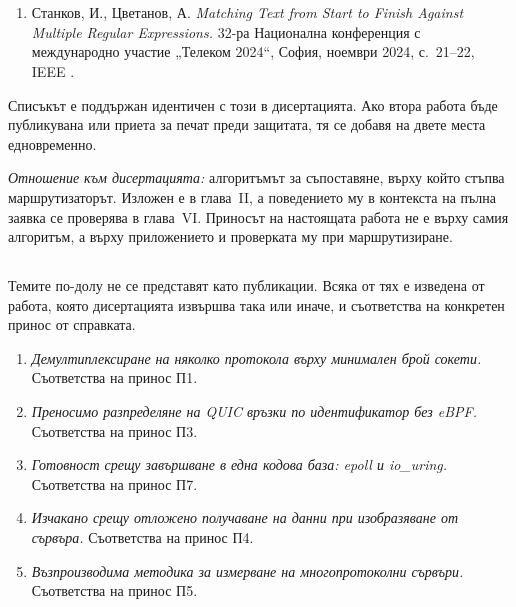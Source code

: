 %

\section*{}

\subsection*{}

\begin{enumerate}[leftmargin=*]
  \item Станков, И., Цветанов, А. \emph{Matching Text from Start to Finish Against Multiple
        Regular Expressions.} 32-ра Национална конференция с международно участие
        „Телеком 2024“, София, ноември 2024, с.~21--22, IEEE \cite{stankov2024regex}.
\end{enumerate}

Списъкът е поддържан идентичен с този в дисертацията. Ако втора работа бъде публикувана или
приета за печат преди защитата, тя се добавя на двете места едновременно.

\emph{Отношение към дисертацията:} алгоритъмът за съпоставяне, върху който стъпва
маршрутизаторът. Изложен е в глава~II, а поведението му в контекста на пълна заявка се
проверява в глава~VI. Приносът на настоящата работа не е върху самия алгоритъм, а върху
приложението и проверката му при маршрутизиране.

\subsection*{}

Темите по-долу не се представят като публикации. Всяка от тях е изведена от работа, която
дисертацията извършва така или иначе, и съответства на конкретен принос от справката.

\begin{enumerate}[leftmargin=*, resume]
  \item \emph{Демултиплексиране на няколко протокола върху минимален брой сокети.}
        Съответства на принос П1.
  \item \emph{Преносимо разпределяне на QUIC връзки по идентификатор без eBPF.}
        Съответства на принос П3.
  \item \emph{Готовност срещу завършване в една кодова база: epoll и io\_uring.}
        Съответства на принос П7.
  \item \emph{Изчакано срещу отложено получаване на данни при изобразяване от сървъра.}
        Съответства на принос П4.
  \item \emph{Възпроизводима методика за измерване на многопротоколни сървъри.}
        Съответства на принос П5.
\end{enumerate}

